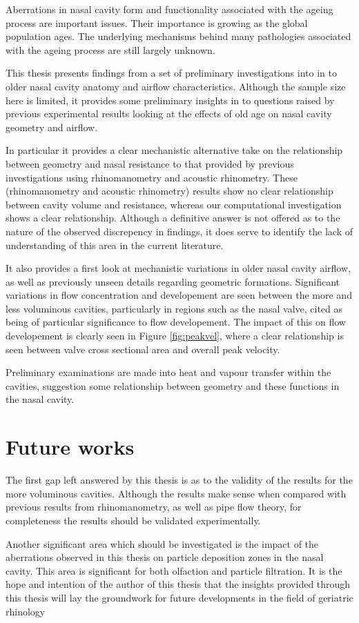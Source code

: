 Aberrations in nasal cavity form and functionality associated with the ageing process are important issues. 
Their importance is growing as the global population ages.
The underlying mechanisms behind many pathologies associated with the ageing process are still largely unknown.

This thesis presents findings from a set of preliminary investigations into in to older nasal cavity anatomy and airflow characteristics.
Although the sample size here is limited, it provides some preliminary insights in to questions raised by previous experimental results looking at the effects of old age on nasal cavity geometry and airflow.

In particular it provides a clear mechanistic alternative take on the relationship between geometry and nasal resistance to that provided by previous investigations using rhinomanometry and acoustic rhinometry. These (rhinomanometry and acoustic rhinometry) results show no clear relationship between cavity volume and resistance, whereas our computational investigation shows a clear relationship. Although a definitive answer is not offered as to the nature of the observed discrepency in findings, it does serve to identify the lack of understanding of this area in the current literature.

It also provides a first look at mechanistic variations in older nasal cavity airflow, as well as previously unseen details regarding geometric formations.
Significant variations in flow concentration and developement are seen between the more and less voluminous cavities, particularly in regions such as the nasal valve, cited as being of particular significance to flow developement. The impact of this on flow developement is clearly seen in Figure \ref{fig:peakvel}, where a clear relationship is seen between valve cross sectional area and overall peak velocity.

Preliminary examinations are made into heat and vapour transfer within the cavities, suggestion some relationship between geometry and these functions in the nasal cavity.

\section{Future works}
The first gap left answered by this thesis is as to the validity of the results for the more voluminous cavities.
Although the results make sense when compared with previous results from rhinomanometry, as well as pipe flow theory, for completeness the results should be validated experimentally.

Another significant area which should be investigated is the impact of the aberrations observed in this thesis on particle deposition zones in the nasal cavity.
This area is significant for both olfaction and particle filtration.
It is the hope and intention of the author of this thesis that the insights provided through this thesis will lay the groundwork for future developments in the field of geriatric rhinology
